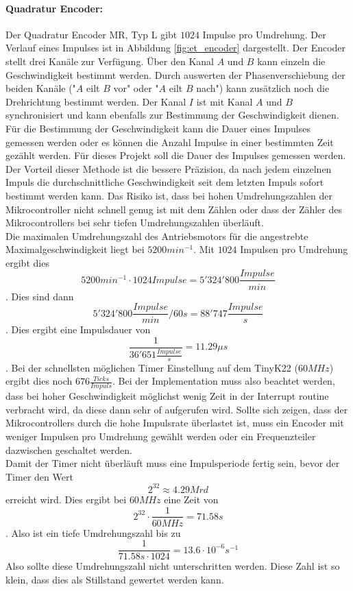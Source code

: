 \documentclass[../../main.tex]{subfiles}
\begin{document}
    \paragraph{Quadratur Encoder:} Der Quadratur Encoder MR, Typ L gibt $1024$ Impulse pro Umdrehung. Der Verlauf eines Impulses ist in Abbildung \ref{fig:et_encoder} dargestellt. Der Encoder stellt drei Kanäle zur Verfügung. Über den Kanal $A$ und $B$ kann einzeln die Geschwindigkeit bestimmt werden. Durch auswerten der Phasenverschiebung der beiden Kanäle ("$A$ eilt $B$ vor" oder "$A$ eilt $B$ nach") kann zusätzlich noch die Drehrichtung bestimmt werden. Der Kanal $I$ ist mit Kanal $A$ und $B$ synchronisiert und kann ebenfalls zur Bestimmung der Geschwindigkeit dienen.\\
    Für die Bestimmung der Geschwindigkeit kann die Dauer eines Impulses gemessen werden oder es können die Anzahl Impulse in einer bestimmten Zeit gezählt werden. Für dieses Projekt soll die Dauer des Impulses gemessen werden. Der Vorteil dieser Methode ist die bessere Präzision, da nach jedem einzelnen Impuls die durchschnittliche Geschwindigkeit seit dem letzten Impuls sofort bestimmt werden kann. Das Risiko ist, dass bei hohen Umdrehungszahlen der Mikrocontroller nicht schnell genug ist mit dem Zählen oder dass der Zähler des Mikrocontrollers bei sehr tiefen Umdrehungszahlen überläuft.\\
    Die maximalen Umdrehungszahl des Antriebsmotors für die angestrebte Maximalgeschwindigkeit liegt bei $5200 min^{-1}$. Mit $1024$ Impulsen pro Umdrehung ergibt dies $$5200 min^{-1} \cdot 1024 Impulse = 5'324'800 \frac{Impulse}{min}$$.
    Dies sind dann $$ 5'324'800 \frac{Impulse}{min} / 60s = 88'747 \frac{Impulse}{s} $$.
    Dies ergibt eine Impulsdauer von $$\frac{1}{36'651 \frac{Impulse}{s}} = 11.29\mu s$$. Bei der schnellsten möglichen Timer Einstellung auf dem TinyK22 ($60MHz$) ergibt dies noch $676 \frac{Ticks}{Impuls}$. Bei der Implementation muss also beachtet werden, dass bei hoher Geschwindigkeit möglichst wenig Zeit in der Interrupt routine verbracht wird, da diese dann sehr of aufgerufen wird. Sollte sich zeigen, dass der Mikrocontrollers durch die hohe Impulsrate überlastet ist, muss ein Encoder mit weniger Impulsen pro Umdrehung gewählt werden oder ein Frequenzteiler dazwischen geschaltet werden.\\
    Damit der Timer nicht überläuft muss eine Impulsperiode fertig sein, bevor der Timer den Wert $$2^{32} \approx 4.29 Mrd$$ erreicht wird. Dies ergibt bei $60MHz$ eine Zeit von $$2^{32} \cdot \frac{1}{60MHz} = 71.58s$$. Also ist ein tiefe Umdrehungszahl bis zu $$\frac{1}{71.58s \cdot 1024} = 13.6 \cdot 10^{-6} s^{-1}$$
    Also sollte diese Umdrehungszahl nicht unterschritten werden. Diese Zahl ist so klein, dass dies als Stillstand gewertet werden kann.
    
\end{document}
